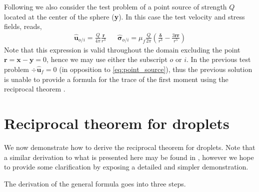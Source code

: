 Following \citet{stone2001inertial} we also consider the test problem of a point source of strength $Q$ located at the center of the sphere (\textbf{y}).
In this case the test velocity  and stress fields, reads\citep{pozrikidis2011introduction,pozrikidis1992boundary}, 
\begin{align}
    \hat{\textbf{u}}_{o/i} = \frac{Q}{4\pi} \frac{\textbf{r}}{r^3}
    && \hat{\bm\sigma}_{o/i} = \mu_f \frac{Q}{2\pi}\left(
        \frac{\bm\delta}{r^3}
        - \frac{3 \textbf{rr}}{r^5}
    \right)
    \label{eq:point_source}
\end{align}
Note that this expression is valid throughout the domain excluding the point $\textbf{r} =  \textbf{x} -  \textbf{y} = 0$, hence we may use either the subscript $o$ or $i$. 
In the previous test problem $\div \hat{\textbf{u}}_f= 0$ (in opposition to \ref{eq:point_source}), thus the previous solution is unable to provide a formula for the trace of the first moment using the reciprocal theorem \citep{stone2001inertial}.


\section{Reciprocal theorem for droplets}

We now demonstrate how to derive the reciprocal theorem for droplets.
Note that a similar derivation to what is presented here may be found in \citet{lovalenti1993force,raja2010inertial}, however we hope to provide some clarification by exposing a detailed and simpler demonstration.  

The derivation of the general formula goes into three steps. 

